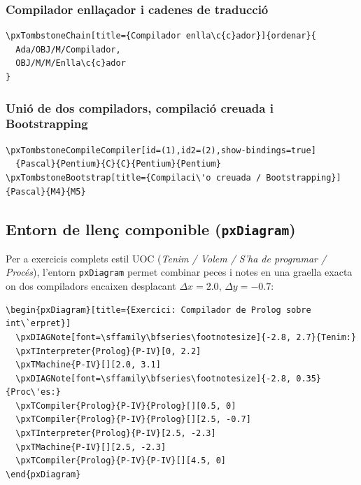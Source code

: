 \documentclass[11pt,a4paper]{article}
\begin{document}
\subsubsection*{Compilador enlla\c{c}ador i cadenes de traducci\'o}
\begin{verbatim}
\pxTombstoneChain[title={Compilador enlla\c{c}ador}]{ordenar}{
  Ada/OBJ/M/Compilador,
  OBJ/M/M/Enlla\c{c}ador
}
\end{verbatim}

\subsubsection*{Uni\'o de dos compiladors, compilaci\'o creuada i Bootstrapping}
\begin{verbatim}
\pxTombstoneCompileCompiler[id=(1),id2=(2),show-bindings=true]
  {Pascal}{Pentium}{C}{C}{Pentium}{Pentium}
\pxTombstoneBootstrap[title={Compilaci\'o creuada / Bootstrapping}]{Pascal}{M4}{M5}
\end{verbatim}


\subsection{Entorn de llen\c{c} componible (\texttt{pxDiagram})}
Per a exercicis complets estil UOC (\emph{Tenim / Volem / S'ha de programar / Proc\'es}),
l'entorn \texttt{pxDiagram} permet combinar peces i notes en una graella exacta on
dos compiladors encaixen desplacant $\Delta x = 2.0$, $\Delta y = -0.7$:

\begin{verbatim}
\begin{pxDiagram}[title={Exercici: Compilador de Prolog sobre int\`erpret}]
  \pxDIAGNote[font=\sffamily\bfseries\footnotesize]{-2.8, 2.7}{Tenim:}
  \pxTInterpreter{Prolog}{P-IV}[0, 2.2]
  \pxTMachine{P-IV}[][2.0, 3.1]
  \pxDIAGNote[font=\sffamily\bfseries\footnotesize]{-2.8, 0.35}{Proc\'es:}
  \pxTCompiler{Prolog}{P-IV}{Prolog}[][0.5, 0]
  \pxTCompiler{Prolog}{P-IV}{Prolog}[][2.5, -0.7]
  \pxTInterpreter{Prolog}{P-IV}[2.5, -2.3]
  \pxTMachine{P-IV}[][2.5, -2.3]
  \pxTCompiler{Prolog}{P-IV}{P-IV}[][4.5, 0]
\end{pxDiagram}
\end{verbatim}
\end{document}
